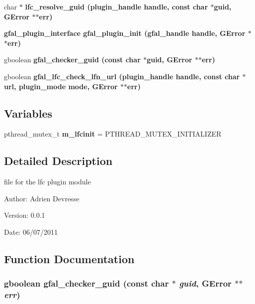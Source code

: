 \begin{CompactItemize}
\item 
char $\ast$ \bf{lfc\_\-resolve\_\-guid} (plugin\_\-handle handle, const char $\ast$guid, GError $\ast$$\ast$err)
\item 
\bf{gfal\_\-plugin\_\-interface} \bf{gfal\_\-plugin\_\-init} (gfal\_\-handle handle, GError $\ast$$\ast$err)
\item 
gboolean \bf{gfal\_\-checker\_\-guid} (const char $\ast$guid, GError $\ast$$\ast$err)
\item 
gboolean \bf{gfal\_\-lfc\_\-check\_\-lfn\_\-url} (plugin\_\-handle handle, const char $\ast$url, plugin\_\-mode mode, GError $\ast$$\ast$err)
\end{CompactItemize}
\subsection*{Variables}
\begin{CompactItemize}
\item 
pthread\_\-mutex\_\-t \textbf{m\_\-lfcinit} = PTHREAD\_\-MUTEX\_\-INITIALIZER\label{gfal__common__lfc_8c_a683cb37b7f14c7d477e4653816d20df}

\end{CompactItemize}


\subsection{Detailed Description}
file for the lfc plugin module 

\begin{Desc}
\item[Author:]Adrien Devresse \end{Desc}
\begin{Desc}
\item[Version:]0.0.1 \end{Desc}
\begin{Desc}
\item[Date:]06/07/2011 \end{Desc}


\subsection{Function Documentation}
\subsubsection{\setlength{\rightskip}{0pt plus 5cm}gboolean gfal\_\-checker\_\-guid (const char $\ast$ {\em guid}, GError $\ast$$\ast$ {\em err})}\label{gfal__common__lfc_8c_c7f9448e809d5c82f58288d1491dc2d0}


